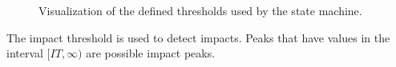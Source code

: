 \documentclass[12pt, a4paper, onecolumn]{article}
\begin{document}
	\begin{figure}[H]
		\centering
		\caption{Visualization of the defined thresholds used by the state machine.}%
		\label{fig:thresholds}%
	\end{figure}
	
	The impact threshold is used to detect impacts. Peaks that have values in the interval
	\( [IT, \infty) \) are possible impact peaks. 
	
\end{document}
